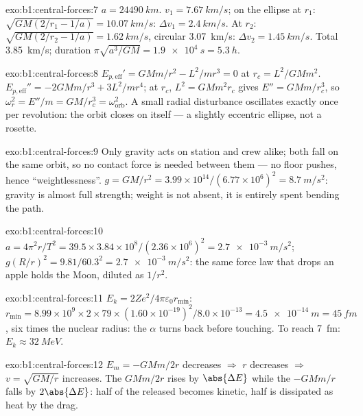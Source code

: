 \begin{solution}{exo:b1:central-forces:7}
$a = \qty{24490}{km}$. $v_1 = \qty{7.67}{km/s}$; on the ellipse at $r_1$:
$\sqrt{GM(2/r_1 - 1/a)} = \qty{10.07}{km/s}$: $\Delta v_1 = \qty{2.4}{km/s}$.
At $r_2$: $\sqrt{GM(2/r_2 - 1/a)} = \qty{1.62}{km/s}$, circular
\qty{3.07}{km/s}: $\Delta v_2 = \qty{1.45}{km/s}$. Total \qty{3.85}{km/s};
duration $\pi\sqrt{a^3/GM} = \qty{1.9e4}{s} = \qty{5.3}{h}$.
\end{solution}

\begin{solution}{exo:b1:central-forces:8}
$E_{p,\mathrm{eff}}' = GMm/r^2 - L^2/mr^3 = 0$ at $r_c = L^2/GMm^2$.
$E_{p,\mathrm{eff}}'' = -2GMm/r^3 + 3L^2/mr^4$; at $r_c$, $L^2 = GMm^2r_c$
gives $E'' = GMm/r_c^3$, so $\omega_r^2 = E''/m = GM/r_c^3 = \omega_{\text{orb}}^2$.
A small radial disturbance oscillates exactly once per revolution: the
orbit closes on itself --- a slightly eccentric ellipse, not a rosette.
\end{solution}

\begin{solution}{exo:b1:central-forces:9}
Only gravity acts on station and crew alike; both fall on the same
orbit, so no contact force is needed between them --- no floor pushes,
hence ``weightlessness''. $g = GM/r^2 = 3.99\times10^{14}/(6.77\times10^6)^2
= \qty{8.7}{m/s^2}$: gravity is almost full strength; weight is not
absent, it is entirely spent bending the path.
\end{solution}

\begin{solution}{exo:b1:central-forces:10}
$a = 4\pi^2r/T^2 = 39.5 \times 3.84\times10^8/(2.36\times10^6)^2 =
\qty{2.7e-3}{m/s^2}$; $g(R/r)^2 = 9.81/60.3^2 = \qty{2.7e-3}{m/s^2}$: the
same force law that drops an apple holds the Moon, diluted as $1/r^2$.
\end{solution}

\begin{solution}{exo:b1:central-forces:11}
$E_k = 2Ze^2/4\pi\varepsilon_0r_{\min}$: $r_{\min} = 8.99\times10^9 \times 2 \times 79
\times (1.60\times10^{-19})^2/8.0\times10^{-13} = \qty{4.5e-14}{m} = \qty{45}{fm}$,
six times the nuclear radius: the $\alpha$ turns back before touching.
To reach \qty{7}{fm}: $E_k \approx \qty{32}{MeV}$.
\end{solution}

\begin{solution}{exo:b1:central-forces:12}
$E_m = -GMm/2r$ decreases $\Rightarrow$ $r$ decreases $\Rightarrow$ $v =
\sqrt{GM/r}$ increases. The  $GMm/2r$ rises by $\abs{\Delta E}$
while the  $-GMm/r$ falls by $2\abs{\Delta E}$: half of the
 released becomes kinetic, half is dissipated as heat
by the drag.
\end{solution}

